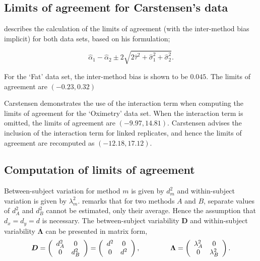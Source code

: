 \documentclass[12pt, a4paper]{report}
\theoremstyle{plain}
\theoremstyle{definition}
\theoremstyle{remark}
\begin{document}
\subsection{Limits of agreement for Carstensen's data}


\citet{BXC2008} describes the calculation of the limits of agreement (with the inter-method bias implicit) for both data sets, based on his formulation;

\[\hat{\alpha}_1 - \hat{\alpha}_2 \pm 2\sqrt{2\hat{\tau}^2 +\hat{\sigma}_1^2 +\hat{\sigma}_2^2 }.\]

For the `Fat' data set, the inter-method bias is shown to be $0.045$. The limits of agreement are $(-0.23 , 0.32)$

Carstensen demonstrates the use of the interaction term when computing the limits of agreement for the `Oximetry' data set. When the interaction term is omitted, the limits of agreement are $(-9.97, 14.81)$. Carstensen advises the inclusion of the interaction term for linked replicates, and hence the limits of agreement are recomputed as $(-12.18,17.12)$.



\subsection{Computation of limits of agreement }


Between-subject variation for method $m$ is given by $d^2_{m}$ and within-subject variation is given by $\lambda^2_{m}$.  \citet{BXC2008} remarks that for two methods $A$ and $B$, separate values of $d^2_{A}$ and $d^2_{B}$ cannot be estimated, only their average. Hence the assumption that $d_{x}= d_{y}= d$ is necessary. The between-subject variability $\boldsymbol{D}$ and within-subject variability $\boldsymbol{\Lambda}$ can be presented in matrix form,\[
\boldsymbol{D} = \left(%
\begin{array}{cc}
d^2_{A}& 0 \\
0 & d^2_{B} \\
\end{array}%
\right)=\left(%
\begin{array}{cc}
d^2& 0 \\
0 & d^2\\
\end{array}%
\right),
\hspace{1.5cm}
\boldsymbol{\Lambda} = \left(%
\begin{array}{cc}
\lambda^2_{A}& 0 \\
0 & \lambda^2_{B} \\
\end{array}%
\right).
\]
\end{document}
